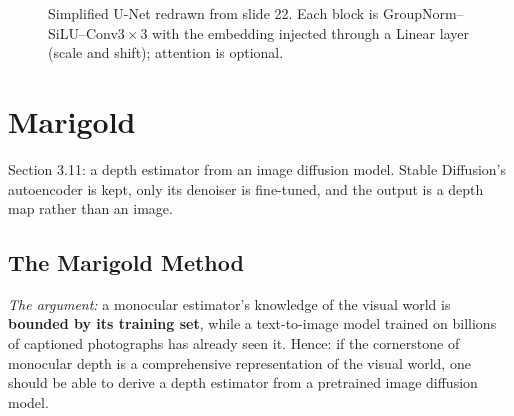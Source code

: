 \documentclass[11pt,a4paper]{article}
\newcommand{\n}{{\bm{n}}}
\theoremstyle{definition}
\theoremstyle{plain}
\theoremstyle{remark}
\begin{document}
\begin{figure}[H]
\centering
{}
\caption{Simplified U-Net redrawn from slide 22. Each block is GroupNorm--SiLU--Conv$3{\times}3$ with the embedding injected through a Linear layer (scale and shift); attention is optional.}
\end{figure}

\section{Marigold }\label{sec:marigold}
Section 3.11: a depth estimator from an image diffusion model. Stable Diffusion's autoencoder is kept, only its denoiser is fine-tuned, and the output is a depth map rather than an image.

\subsection{The Marigold Method }
\emph{The argument:} a monocular estimator's knowledge of the visual world is \textbf{bounded by its training set}, while a text-to-image model trained on billions of captioned photographs has already seen it. Hence: if the cornerstone of monocular depth is a comprehensive representation of the visual world, one should be able to derive a depth estimator from a pretrained image diffusion model.
\end{document}
